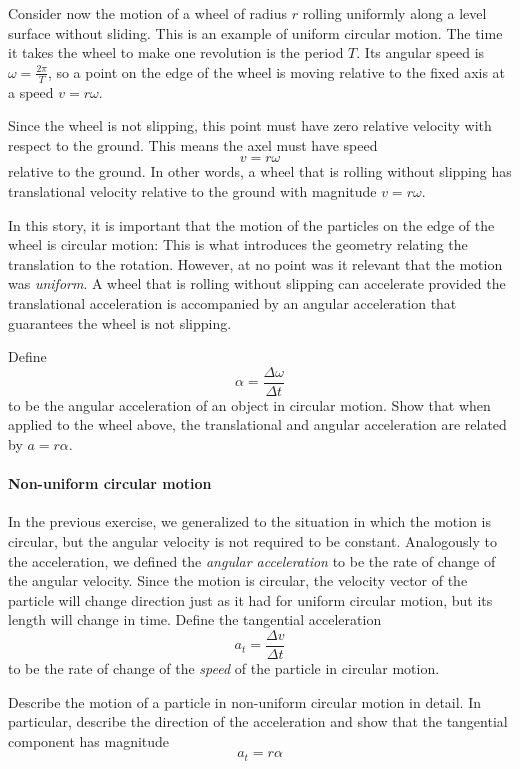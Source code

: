 Consider now the motion of a wheel of radius $r$ rolling uniformly along a level surface without sliding. This is an example of uniform circular motion. The time it takes the wheel to make one revolution is the period $T$. Its angular speed is $ω =\frac {2π}T$, so a point on the edge of the wheel is moving relative to the fixed axis at a speed $v=rω$. 

Since the wheel is not slipping, this point must have zero relative velocity with respect to the ground. This means the axel must have speed 
$$
\boxed{v=rω}
$$ 
relative to the ground. In other words, a wheel that is rolling without slipping has translational velocity relative to the ground with magnitude $v=rω$. 

In this story, it is important that the motion of the particles on the edge of the wheel is circular motion: This is what introduces the geometry relating the translation to the rotation. However, at no point was it relevant that the motion was {\em uniform}. A wheel that is rolling without slipping can accelerate provided the translational acceleration is accompanied by an angular acceleration that guarantees the wheel is not slipping. 

\begin{exercise}
Define 
$$
α = \frac{Δω}{Δt} 
$$
to be the angular acceleration of an object in circular motion. Show that when applied to the wheel above, the translational and angular acceleration are related by $a= r α$.
\end{exercise} 


\paragraph{Non-uniform circular motion}
In the previous exercise, we generalized to the situation in which the motion is circular, but the angular velocity is not required to be constant. 
Analogously to the acceleration, we defined the {\em angular acceleration} to be the rate of change of the angular velocity. 
 Since the motion is circular, the velocity vector of the particle will change direction just as it had for uniform circular motion, but its length will change in time. Define the tangential acceleration 
$$
a_t = \frac{Δv}{Δt}
$$
to be the rate of change of the {\em speed} of the particle in circular motion. 

\begin{exercise}
Describe the motion of a particle in non-uniform circular motion in detail. In particular, describe the direction of the acceleration and show that the tangential component has magnitude 
$$
a_t = r α
$$
\end{exercise} 


